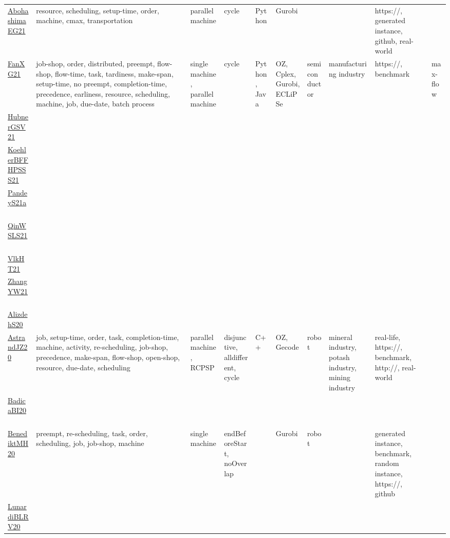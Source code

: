 {\begin{longtable}{p{3cm}p{4cm}p{2cm}p{2cm}p{2cm}p{2cm}p{2cm}p{2cm}p{2cm}p{2cm}}
\href{articles/AbohashimaEG21.pdf}{AbohashimaEG21}~\cite{AbohashimaEG21} & resource, scheduling, setup-time, order, machine, cmax, transportation & parallel machine & cycle & Python & Gurobi &  &  & https://, generated instance, github, real-world & \\
\href{articles/FanXG21.pdf}{FanXG21}~\cite{FanXG21} & job-shop, order, distributed, preempt, flow-shop, flow-time, task, tardiness, make-span, setup-time, no preempt, completion-time, precedence, earliness, resource, scheduling, machine, job, due-date, batch process & single machine, parallel machine & cycle & Python, Java & OZ, Cplex, Gurobi, ECLiPSe & semiconductor & manufacturing industry & https://, benchmark & max-flow\\
\href{articles/HubnerGSV21.pdf}{HubnerGSV21}~\cite{HubnerGSV21} &  &  &  &  &  &  &  &  & \\
\href{articles/KoehlerBFFHPSSS21.pdf}{KoehlerBFFHPSSS21}~\cite{KoehlerBFFHPSSS21} &  &  &  &  &  &  &  &  & \\
\href{articles/PandeyS21a.pdf}{PandeyS21a}~\cite{PandeyS21a} &  &  &  &  &  &  &  &  & \\
\href{articles/QinWSLS21.pdf}{QinWSLS21}~\cite{QinWSLS21} &  &  &  &  &  &  &  &  & \\
\href{articles/VlkHT21.pdf}{VlkHT21}~\cite{VlkHT21} &  &  &  &  &  &  &  &  & \\
\href{articles/ZhangYW21.pdf}{ZhangYW21}~\cite{ZhangYW21} &  &  &  &  &  &  &  &  & \\
\href{}{AlizdehS20}~\cite{AlizdehS20} &  &  &  &  &  &  &  &  & \\
\href{articles/AstrandJZ20.pdf}{AstrandJZ20}~\cite{AstrandJZ20} & job, setup-time, order, task, completion-time, machine, activity, re-scheduling, job-shop, precedence, make-span, flow-shop, open-shop, resource, due-date, scheduling & parallel machine, RCPSP & disjunctive, alldifferent, cycle & C++ & OZ, Gecode & robot & mineral industry, potash industry, mining industry & real-life, https://, benchmark, http://, real-world & \\
\href{}{BadicaBI20}~\cite{BadicaBI20} &  &  &  &  &  &  &  &  & \\
\href{articles/BenediktMH20.pdf}{BenediktMH20}~\cite{BenediktMH20} & preempt, re-scheduling, task, order, scheduling, job, job-shop, machine & single machine & endBeforeStart, noOverlap &  & Gurobi & robot &  & generated instance, benchmark, random instance, https://, github & \\
\href{articles/LunardiBLRV20.pdf}{LunardiBLRV20}~\cite{LunardiBLRV20} &  &  &  &  &  &  &  &  & \\

\end{longtable}}
